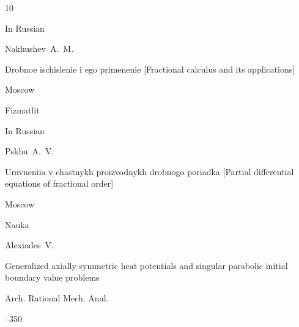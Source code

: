 





\newpage



\begin{thebibliography}{10}




\lang In Russian

\by Nakhushev~A.~M.

\book Drobnoe ischislenie i ego primenenie \rm [Fractional calculus and its applications]

\publaddr Moscow

\publ Fizmatlit 








\lang In Russian

\by Pskhu~A.~V.

\book Uravneniia v chastnykh proizvodnykh drobnogo poriadka \rm [Partial differential equations of fractional order]

\publaddr Moscow

\publ Nauka 










\by Alexiades~V.

\paper Generalized axially symmetric heat potentials and singular parabolic initial boundary value problems

\jour  Arch. Rational Mech. Anal. 




--350









\end{thebibliography}
